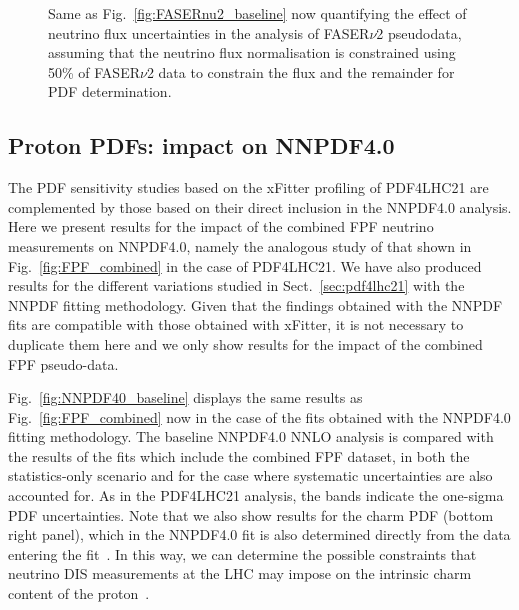 \begin{figure}[t]
\caption{
  Same as Fig.~\ref{fig:FASERnu2_baseline} now quantifying the
  effect of neutrino flux uncertainties in the analysis of FASER$\nu$2 pseudodata, assuming that the neutrino flux normalisation is constrained using 50\% of FASER$\nu$2 data to constrain the flux and the remainder for PDF determination. 
}
\label{fig:FASERv2_flux_unc_HL-LHC}
\end{figure}


\subsection{Proton PDFs: impact on NNPDF4.0}
\label{sec:nnpdf40}

The PDF sensitivity studies based on the {\sc\small xFitter} profiling
of PDF4LHC21 are complemented by those based on their direct inclusion
in the NNPDF4.0 analysis.
%
Here we present results for the impact of the combined FPF neutrino
measurements on NNPDF4.0, namely the analogous study of that shown
in Fig.~\ref{fig:FPF_combined} in the case of PDF4LHC21.
%
We have also produced results for the different variations studied in
Sect.~\ref{sec:pdf4lhc21} with the NNPDF fitting methodology.
%
Given that the findings obtained with the NNPDF fits
are compatible with those obtained with {\sc\small xFitter}, it is not necessary to duplicate them here
and we only show results for the impact of the combined FPF pseudo-data.

Fig.~\ref{fig:NNPDF40_baseline} displays the
same results as Fig.~\ref{fig:FPF_combined} now in the case of the
fits obtained with the NNPDF4.0 fitting methodology.
%
The baseline NNPDF4.0 NNLO analysis is compared
with the results of the fits which include the combined FPF dataset,
in both the statistics-only scenario and for the case
where systematic uncertainties are also accounted for.
%
As in the PDF4LHC21 analysis, the bands indicate the one-sigma PDF uncertainties.
%
Note that we also show results for the charm PDF (bottom right panel), which
in the NNPDF4.0 fit is also determined directly from the data entering
the fit~\cite{Ball:2016neh}.
%
In this way, we can determine the possible constraints that neutrino
DIS measurements at the LHC may impose on the intrinsic charm
content of the proton~\cite{Ball:2022qks}.

